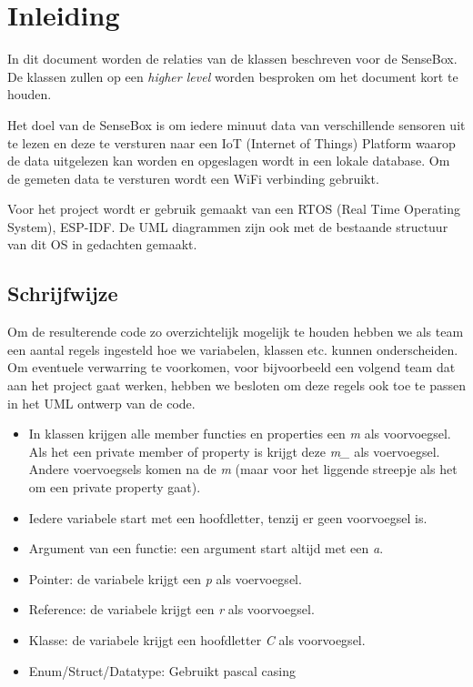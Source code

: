 \section{Inleiding}

In dit document worden de relaties van de klassen beschreven voor de SenseBox. De klassen zullen op een \emph{higher level} worden besproken om het document kort te houden.

\vspace{1em}
Het doel van de SenseBox is om iedere minuut data van verschillende sensoren uit te lezen en deze te versturen naar een IoT (Internet of Things) Platform waarop de data uitgelezen kan worden en opgeslagen wordt in een lokale database. Om de gemeten data te versturen wordt een WiFi verbinding gebruikt.

\vspace{1em}
Voor het project wordt er gebruik gemaakt van een RTOS (Real Time Operating System), ESP-IDF. De UML diagrammen zijn ook met de bestaande structuur van dit OS in gedachten gemaakt.

\subsection{Schrijfwijze}

Om de resulterende code zo overzichtelijk mogelijk te houden hebben we als team een aantal regels ingesteld hoe we variabelen, klassen etc. kunnen onderscheiden. Om eventuele verwarring te voorkomen, voor bijvoorbeeld een volgend team dat aan het project gaat werken, hebben we besloten om deze regels ook toe te passen in het UML ontwerp van de code.

\vspace{1em}

\begin{itemize}
  \item In klassen krijgen alle member functies en properties een \textit{m} als voorvoegsel. Als het een private member of property is krijgt deze \textit{m\_} als voervoegsel. Andere voervoegsels komen na de \textit{m} (maar voor het liggende streepje als het om een private property gaat).
  \item Iedere variabele start met een hoofdletter, tenzij er geen voorvoegsel is.
  \item Argument van een functie: een argument start altijd met een \textit{a}.
  \item Pointer: de variabele krijgt een \textit{p} als voervoegsel.
  \item Reference: de variabele krijgt een \textit{r} als voorvoegsel.
  \item Klasse: de variabele krijgt een hoofdletter \textit{C} als voorvoegsel.
  \item Enum/Struct/Datatype: Gebruikt pascal casing
\end{itemize}